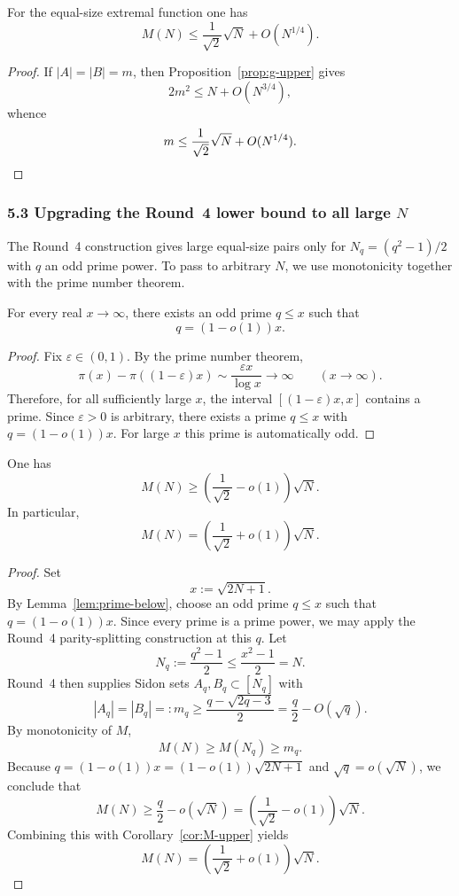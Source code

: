 \begin{corollary}\label{cor:M-upper}
For the equal-size extremal function one has
\[
M(N)\le \frac1{\sqrt2}\sqrt N+O(N^{1/4}).
\]
\end{corollary}

\begin{proof}
If $|A|=|B|=m$, then Proposition~\ref{prop:g-upper} gives
\[
2m^2\le N+O(N^{3/4}),
\]
whence
\[
m\le \frac1{\sqrt2}\sqrt N+O(N^{1/4}).
\qedhere
\]
\end{proof}

\subsubsection{5.3 Upgrading the Round~4 lower bound to all large $N$}

The Round~4 construction gives large equal-size pairs only for $N_q=(q^2-1)/2$ with $q$ an odd prime power.  To pass to arbitrary $N$, we use monotonicity together with the prime number theorem.

\begin{lemma}\label{lem:prime-below}
For every real $x\to\infty$, there exists an odd prime $q\le x$ such that
\[
q=(1-o(1))x.
\]
\end{lemma}

\begin{proof}
Fix $\varepsilon\in(0,1)$.  By the prime number theorem,
\[
\pi(x)-\pi((1-\varepsilon)x)\sim \frac{\varepsilon x}{\log x}\to\infty
\qquad (x\to\infty).
\]
Therefore, for all sufficiently large $x$, the interval $[(1-\varepsilon)x,x]$ contains a prime.  Since $\varepsilon>0$ is arbitrary, there exists a prime $q\le x$ with $q=(1-o(1))x$.  For large $x$ this prime is automatically odd.
\end{proof}

\begin{proposition}\label{prop:M-lower-allN}
One has
\[
M(N)\ge \left(\frac1{\sqrt2}-o(1)\right)\sqrt N.
\]
In particular,
\[
M(N)=\left(\frac1{\sqrt2}+o(1)\right)\sqrt N.
\]
\end{proposition}

\begin{proof}
Set
\[
x:=\sqrt{2N+1}.
\]
By Lemma~\ref{lem:prime-below}, choose an odd prime $q\le x$ such that $q=(1-o(1))x$.  Since every prime is a prime power, we may apply the Round~4 parity-splitting construction at this $q$.  Let
\[
N_q:=\frac{q^2-1}{2}\le \frac{x^2-1}{2}=N.
\]
Round~4 then supplies Sidon sets $A_q,B_q\subset[N_q]$ with
\[
|A_q|=|B_q|=:m_q\ge \frac{q-\sqrt{2q-3}}{2} = \frac q2-O(\sqrt q).
\]
By monotonicity of $M$,
\[
M(N)\ge M(N_q)\ge m_q.
\]
Because $q=(1-o(1))x=(1-o(1))\sqrt{2N+1}$ and $\sqrt q=o(\sqrt N)$, we conclude that
\[
M(N)\ge \frac q2-o(\sqrt N)
=\left(\frac1{\sqrt2}-o(1)\right)\sqrt N.
\]
Combining this with Corollary~\ref{cor:M-upper} yields
\[
M(N)=\left(\frac1{\sqrt2}+o(1)\right)\sqrt N.
\]
\end{proof}

